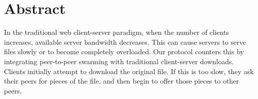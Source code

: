 \section {Abstract}
In the traditional web client-server paradigm, when the number of clients increases, available server bandwidth decreases.  This can cause servers to serve files slowly or to become completely overloaded.  Our protocol counters this by integrating peer-to-peer swarming with traditional client-server downloads.  Clients initially attempt to download the original file.  If this is too slow, they ask their peers for pieces of the file, and then begin to offer those pieces to other peers.
